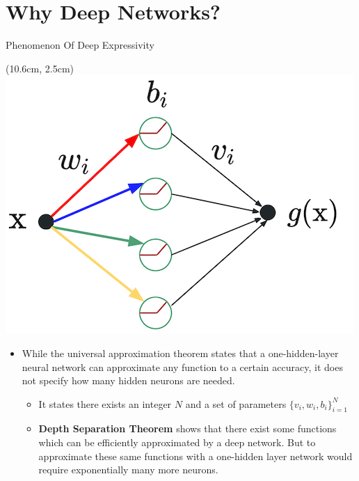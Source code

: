 \documentclass[serif, aspectratio=169]{beamer}
\begin{document}
\section{Why Deep Networks?}
\begin{frame}{Phenomenon Of Deep Expressivity}
	\begin{textblock*}{5cm}(10.6cm, 2.5cm)
		\includegraphics[keepaspectratio, scale=0.3]{pic/mlp}
	\end{textblock*}
	
	\begin{itemize}
		\item While the universal approximation theorem states that \newline a one-hidden-layer neural network can approximate \newline any function to a certain accuracy, it does not specify \newline how many hidden neurons are needed.
		\begin{itemize}
			\item It states there exists an integer $N$ and a set of \newline parameters $\{v_i,w_i,b_i\}_{i=1}^N$
			\item \textbf{Depth Separation Theorem} shows that there exist \newline some functions which can be efficiently approximated \newline by a deep network. But to approximate these same \newline functions with a one-hidden layer network would require \newline exponentially many more neurons.
		\end{itemize}
		
	\end{itemize}
\end{frame}
\end{document}
